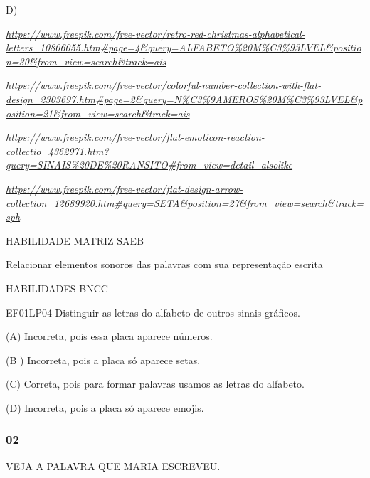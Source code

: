D)

\href{https://www.freepik.com/free-vector/retro-red-christmas-alphabetical-letters_10806055.htm\#page=4\&query=ALFABETO\%20M\%C3\%93LVEL\&position=30\&from_view=search\&track=ais}{\emph{https://www.freepik.com/free-vector/retro-red-christmas-alphabetical-letters\_10806055.htm\#page=4\&query=ALFABETO\%20M\%C3\%93LVEL\&position=30\&from\_view=search\&track=ais}}

\href{https://www.freepik.com/free-vector/colorful-number-collection-with-flat-design_2303697.htm\#page=2\&query=N\%C3\%9AMEROS\%20M\%C3\%93LVEL\&position=21\&from_view=search\&track=ais}{\emph{https://www.freepik.com/free-vector/colorful-number-collection-with-flat-design\_2303697.htm\#page=2\&query=N\%C3\%9AMEROS\%20M\%C3\%93LVEL\&position=21\&from\_view=search\&track=ais}}

\href{https://www.freepik.com/free-vector/flat-emoticon-reaction-collectio_4362971.htm?query=SINAIS\%20DE\%20RANSITO\#from_view=detail_alsolike}{\emph{https://www.freepik.com/free-vector/flat-emoticon-reaction-collectio\_4362971.htm?query=SINAIS\%20DE\%20RANSITO\#from\_view=detail\_alsolike}}

\href{https://www.freepik.com/free-vector/flat-design-arrow-collection_12689920.htm\#query=SETA\&position=27\&from_view=search\&track=sph}{\emph{https://www.freepik.com/free-vector/flat-design-arrow-collection\_12689920.htm\#query=SETA\&position=27\&from\_view=search\&track=sph}}

HABILIDADE MATRIZ SAEB

Relacionar elementos sonoros das palavras com sua representação escrita

HABILIDADES BNCC

EF01LP04 Distinguir as letras do alfabeto de outros sinais gráficos.

(A) Incorreta, pois essa placa aparece números.

(B ) Incorreta, pois a placa só aparece setas.

(C) Correta, pois para formar palavras usamos as letras do alfabeto.

(D) Incorreta, pois a placa só aparece
emojis.\protect\hypertarget{_heading=h.kl8qv6rrx63u}{}{}

\subsubsection{02}\label{section-74}

VEJA A PALAVRA QUE MARIA ESCREVEU.

